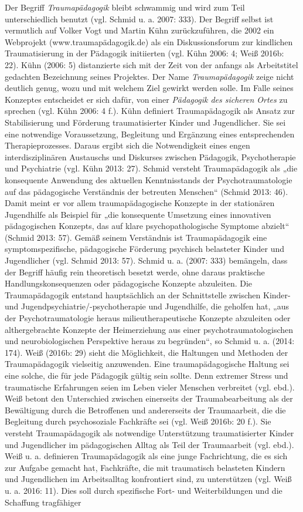 Der Begriff \textit{Traumapädagogik} bleibt schwammig und wird zum Teil unterschiedlich benutzt (vgl. Schmid u. a. 2007: 333). Der Begriff selbst ist vermutlich auf Volker Vogt und Martin Kühn zurückzuführen, die 2002 ein Webprojekt (www.traumapädagogik.de) als ein Diskussionsforum zur kindlichen Traumatisierung in der Pädagogik initiierten (vgl. Kühn 2006: 4; Weiß 2016b: 22). Kühn (2006: 5) distanzierte sich mit der Zeit von der anfangs als Arbeitstitel gedachten Bezeichnung seines Projektes. Der Name \textit{Traumapädagogik} zeige nicht deutlich genug, wozu und mit welchem Ziel gewirkt werden solle. Im Falle seines Konzeptes entscheidet er sich dafür, von einer \textit{Pädagogik des sicheren Ortes} zu sprechen (vgl. Kühn 2006: 4 f.). Kühn definiert Traumapädagogik als Ansatz zur Stabilisierung und Förderung traumatisierter Kinder und Jugendlicher. Sie sei eine notwendige Voraussetzung, Begleitung und Ergänzung eines entsprechenden Therapieprozesses. Daraus ergibt sich die Notwendigkeit eines engen interdisziplinären Austauschs und Diskurses zwischen Pädagogik, Psychotherapie und Psychiatrie (vgl. Kühn 2013: 27). Schmid versteht Traumapädagogik als „die konsequente Anwendung des aktuellen Kenntnisstands der Psychotraumatologie auf das pädagogische Verständnis der betreuten Menschen“ (Schmid 2013: 46). Damit meint er vor allem traumapädagogische Konzepte in der stationären Jugendhilfe als Beispiel für „die konsequente Umsetzung eines innovativen pädagogischen Konzepts, das auf klare psychopathologische Symptome abzielt“ (Schmid 2013: 57). Gemäß seinem Verständnis ist Traumapädagogik eine symptomspezifische, pädagogische Förderung psychisch belasteter Kinder und Jugendlicher (vgl. Schmid 2013: 57). Schmid u. a. (2007: 333) bemängeln, dass der Begriff häufig rein theoretisch besetzt werde, ohne daraus praktische Handlungskonsequenzen oder pädagogische Konzepte abzuleiten. Die Traumapädagogik entstand hauptsächlich an der Schnittstelle zwischen Kinder- und Jugendpsychiatrie/-psychotherapie und Jugendhilfe, die geholfen hat, „aus der Psychotraumatologie heraus milieutherapeutische Konzepte abzuleiten oder althergebrachte Konzepte der Heimerziehung aus einer psychotraumatologischen und neurobiologischen Perspektive heraus zu begründen“, so Schmid u. a. (2014: 174). Weiß (2016b: 29) sieht die Möglichkeit, die Haltungen und Methoden der Traumapädagogik vielseitig anzuwenden. Eine traumapädagogische Haltung sei eine solche, die für jede Pädagogik gültig sein sollte. Denn extremer Stress und traumatische Erfahrungen seien im Leben vieler Menschen verbreitet (vgl. ebd.). Weiß betont den Unterschied zwischen einerseits der Traumabearbeitung als der Bewältigung durch die Betroffenen und andererseits der Traumaarbeit, die die Begleitung durch psychosoziale Fachkräfte sei (vgl. Weiß 2016b: 20 f.). Sie versteht Traumapädagogik als notwendige Unterstützung traumatisierter Kinder und Jugendlicher im pädagogischen Alltag als Teil der Traumaarbeit (vgl. ebd.). Weiß u. a. definieren Traumapädagogik als eine junge Fachrichtung, die es sich zur Aufgabe gemacht hat, Fachkräfte, die mit traumatisch belasteten Kindern und Jugendlichen im Arbeitsalltag konfrontiert sind, zu unterstützen (vgl. Weiß u. a. 2016: 11). Dies soll durch spezifische Fort- und Weiterbildungen und die Schaffung tragfähiger 